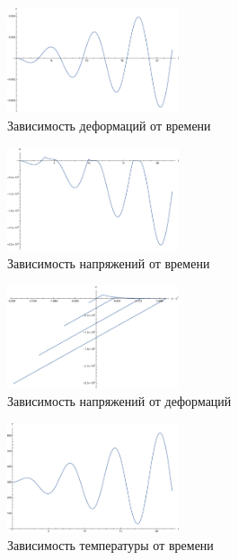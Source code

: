 \documentclass[unicode]{beamer}
\begin{document}
    \begin{frame}
        \begin{figure}
            \centering
            \includegraphics[width=0.45\textwidth]{T1/h_1_tau_0.05/epsilon(t).pdf}
            \caption{Зависимость деформаций от времени}
        \end{figure}

        \begin{figure}
                \centering
                \includegraphics[width=0.45\textwidth]{T1/h_1_tau_0.05/sigma(t).pdf}
                \caption{Зависимость напряжений от времени}
       \end{figure}
    \end{frame}

    \begin{frame}
        \begin{figure}
            \centering
            \includegraphics[width=0.45\textwidth]{T1/h_1_tau_0.05/sigma(epsilon).pdf}
            \caption{Зависимость напряжений от деформаций}
        \end{figure}

        \begin{figure}
                \centering
                \includegraphics[width=0.45\textwidth]{T1/h_1_tau_0.05/T(t).pdf}
                \caption{Зависимость температуры от времени}
       \end{figure}
    \end{frame}
    
\end{document}

